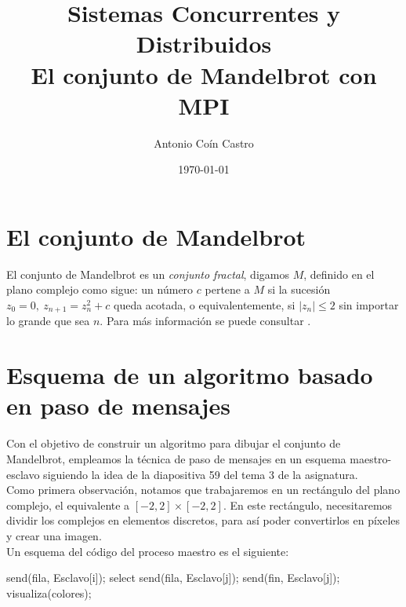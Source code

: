 \documentclass[11pt]{article}
\title{Sistemas Concurrentes y Distribuidos\\ \large El conjunto de Mandelbrot con MPI}
\author{Antonio Coín Castro}
\date{\today}
\begin{document}
\maketitle


\section*{El conjunto de Mandelbrot}

El conjunto de Mandelbrot es un \textit{conjunto fractal}, digamos $M$, definido en el plano complejo como sigue: un número $c$ pertene a $M$ si la sucesión $z_0 = 0, \ z_{n+1} = z_n^2 + c$ queda acotada, o equivalentemente, si $|z_n| \le 2$ sin importar lo grande que sea $n$. Para más información se puede consultar \cite{mandelbrot}.



\section*{Esquema de un algoritmo basado en paso de mensajes}

Con el objetivo de construir un algoritmo para dibujar el conjunto de Mandelbrot, empleamos la técnica de paso de mensajes en un esquema maestro-esclavo siguiendo la idea de la diapositiva 59 del tema 3 de la asignatura. \\

Como primera observación, notamos que trabajaremos en un rectángulo del plano complejo, el equivalente a $[-2,2] \times [-2,2]$. En este rectángulo, necesitaremos dividir los complejos en elementos discretos, para así poder convertirlos en píxeles y crear una imagen.\\

Un esquema del código del proceso maestro es el siguiente:

\begin{algorithm}[h]
\begin{algorithmic}

     
         \State send(fila, Esclavo[i]);
            \EndFor
         	\State select
         		\State send(fila, Esclavo[j]);
         		\Else
         		    \State send(fin, Esclavo[j]);
         		\EndIf
         	\EndFor
         \EndWhile
         \State visualiza(colores);
  \EndFunction
\end{algorithmic}
\end{algorithm}
\end{document}
